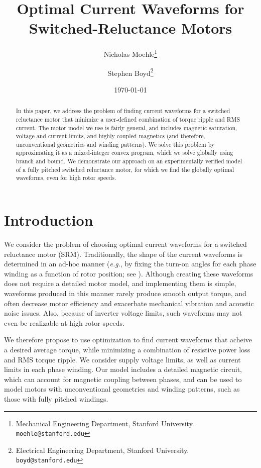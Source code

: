 \documentclass[11pt]{article}
\title{Optimal Current Waveforms for Switched-Reluctance Motors}
\author{
Nicholas Moehle\thanks{
Mechanical Engineering Department, Stanford University. 
\texttt{moehle@stanford.edu}}
\and Stephen Boyd\thanks{
Electrical Engineering Department, Stanford University. 
\texttt{boyd@stanford.edu}}
}
\date{\today}
\newcommand{\eg}{{\it e.g.}}
\begin{document}
\maketitle

\begin{abstract}
In this paper, we address the problem of finding current waveforms
for a switched reluctance motor
that minimize a user-defined combination of torque ripple and RMS current.
The motor model we use is fairly general,
and includes magnetic saturation,
voltage and current limits,
and highly coupled magnetics
(and therefore, unconventional geometries and winding patterns).
We solve this problem by approximating it as a mixed-integer convex program,
which we solve globally using branch and bound.
We demonstrate our approach on an experimentally verified
model of a fully pitched switched reluctance motor,
for which we find the globally optimal waveforms, even for high rotor speeds.
\end{abstract}

\section{Introduction}
We consider the problem of choosing optimal current waveforms for a
switched reluctance motor (SRM).
Traditionally, the shape of the current waveforms
is determined in an ad-hoc manner
(\eg, by fixing the turn-on angles for each phase winding
as a function of rotor position;
see \cite{toliyat2012handbook}).
Although creating these waveforms does not require a detailed motor model,
and implementing them is simple,
waveforms produced in this manner rarely produce
smooth output torque,
and often decrease motor efficiency
and exacerbate mechanical vibration and acoustic noise issues.
Also, because of inverter voltage limits,
such waveforms may not even be realizable at high rotor speeds.

We therefore propose to use optimization to find current waveforms
that acheive a desired average torque, 
while minimizing a combination of resistive power loss and RMS torque ripple.
We consider supply voltage limits, 
as well as current limits in each phase winding.
Our model includes a detailed magnetic circuit,
which can account for magnetic coupling between phases,
and can be used to model motors with unconventional geometries and winding patterns,
such as those with fully pitched windings.
\end{document}
